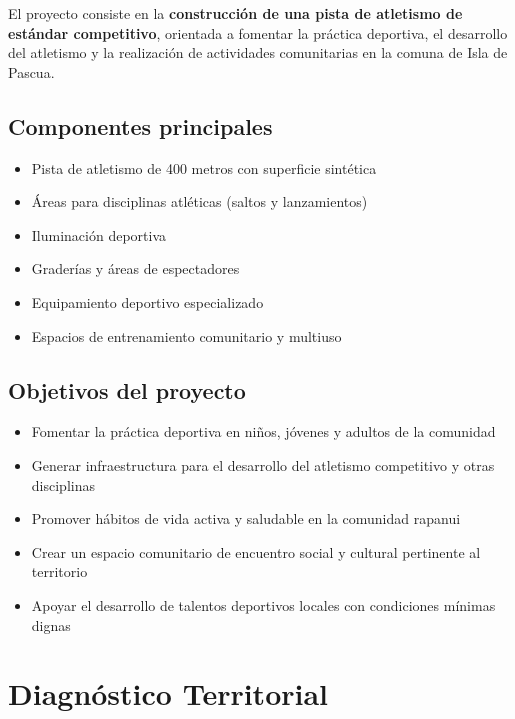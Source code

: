\documentclass[12pt, a4paper]{article}
\begin{document}
El proyecto consiste en la \textbf{construcción de una pista de atletismo de estándar
competitivo}, orientada a fomentar la práctica deportiva, el desarrollo del atletismo
y la realización de actividades comunitarias en la comuna de Isla de Pascua.

\subsection{Componentes principales}

\begin{itemize}[leftmargin=*, itemsep=3pt]
  \item Pista de atletismo de 400 metros con superficie sintética
  \item Áreas para disciplinas atléticas (saltos y lanzamientos)
  \item Iluminación deportiva
  \item Graderías y áreas de espectadores
  \item Equipamiento deportivo especializado
  \item Espacios de entrenamiento comunitario y multiuso
\end{itemize}

\subsection{Objetivos del proyecto}

\begin{itemize}[leftmargin=*, itemsep=3pt]
  \item Fomentar la práctica deportiva en niños, jóvenes y adultos de la comunidad
  \item Generar infraestructura para el desarrollo del atletismo competitivo y otras
        disciplinas
  \item Promover hábitos de vida activa y saludable en la comunidad rapanui
  \item Crear un espacio comunitario de encuentro social y cultural pertinente al
        territorio
  \item Apoyar el desarrollo de talentos deportivos locales con condiciones mínimas
        dignas
\end{itemize}

\section{Diagnóstico Territorial}
\label{sec:diagnostico}
\end{document}
